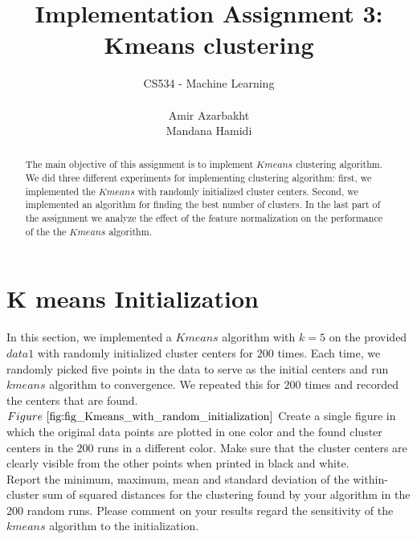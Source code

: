 \documentclass{article} %
\title{\Large{\textbf{ Implementation  Assignment 3: Kmeans clustering }}}
\author{CS534 - Machine Learning \\
\\
Amir Azarbakht\\
Mandana Hamidi\\
}
\begin{document}
\maketitle
\begin{abstract}
The main objective of this assignment is to implement $Kmeans$ clustering algorithm. We did three different experiments for implementing clustering algorithm: first, we implemented the $Kmeans$ with randomly initialized cluster centers. Second, we implemented an algorithm for finding the best number of clusters. In the last part of the assignment we analyze the effect of the feature normalization on the performance of the the $Kmeans$ algorithm.
\end{abstract}

\section{K means Initialization }
In this section, we implemented  a $Kmeans$ algorithm with $k = 5$ on the provided $data1$ with randomly initialized cluster centers for $200$ times. Each time, we randomly picked five points in the data to serve as the initial centers and run $kmeans$ algorithm to convergence. We repeated this for $200$ times and recorded the centers that are found.\\
$Figure~\ref{fig:fig_Kmeans_with_random_initialization}$  
Create a single figure in which the original data points are plotted in one color and the found cluster centers in the $200$ runs in a different color. Make sure that the cluster centers are clearly visible from the other points when printed in black and white.\\
 Report the minimum, maximum, mean and standard deviation of the within-cluster sum of squared distances for the clustering found by your algorithm in the $200$ random runs. Please comment on your results regard the sensitivity of the $kmeans$ algorithm to the initialization.
\end{document}
